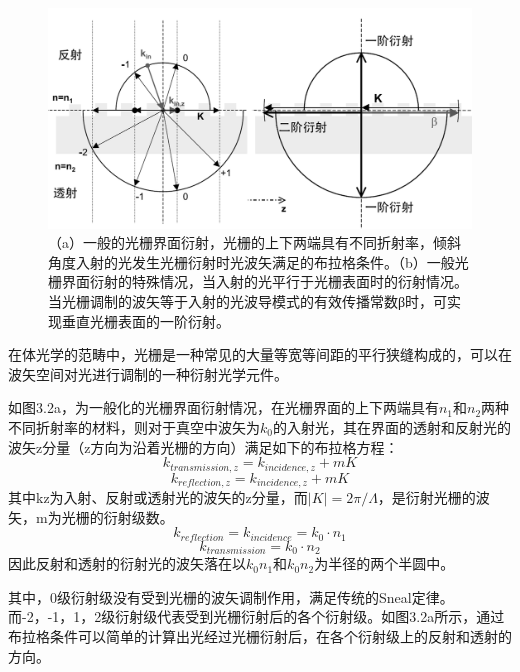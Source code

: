 \begin{figure}[!htbp]
    \centering
    \includegraphics[width=1\textwidth]{Img/3-2.png}
    \caption{（a）一般的光栅界面衍射，光栅的上下两端具有不同折射率，倾斜角度入射的光发生光栅衍射时光波矢满足的布拉格条件。（b）一般光栅界面衍射的特殊情况，当入射的光平行于光栅表面时的衍射情况。当光栅调制的波矢等于入射的光波导模式的有效传播常数β时，可实现垂直光栅表面的一阶衍射。\cite{Dirkgrating}}
    \label{fig:3-2}
\end{figure}

在体光学的范畴中，光栅是一种常见的大量等宽等间距的平行狭缝构成的，可以在波矢空间对光进行调制的一种衍射光学元件。

如图3.2a，为一般化的光栅界面衍射情况，在光栅界面的上下两端具有$n_1$和$n_2$两种不同折射率的材料，则对于真空中波矢为$k_0$的入射光，其在界面的透射和反射光的波矢z分量（z方向为沿着光栅的方向）满足如下的布拉格方程：
\begin{equation}
k_{transmission,z}= k_{incidence,z}  + mK
\end{equation}
\begin{equation}
k_{reflection,z}= k_{incidence,z}  + mK
\end{equation}
其中kz为入射、反射或透射光的波矢的z分量，而$|K| = 2\pi/\Lambda $，是衍射光栅的波矢，m为光栅的衍射级数。
\begin{equation}
k_{reflection}=k_{incidence}=k_0⋅n_1
\end{equation}
\begin{equation}
k_{transmission}=k_0⋅n_2
\end{equation}
因此反射和透射的衍射光的波矢落在以$k_0n_1$和$k_0n_2$为半径的两个半圆中。

其中，0级衍射级没有受到光栅的波矢调制作用，满足传统的Sneal定律。而-2，-1，1，2级衍射级代表受到光栅衍射后的各个衍射级。如图3.2a所示，通过布拉格条件可以简单的计算出光经过光栅衍射后，在各个衍射级上的反射和透射的方向。

